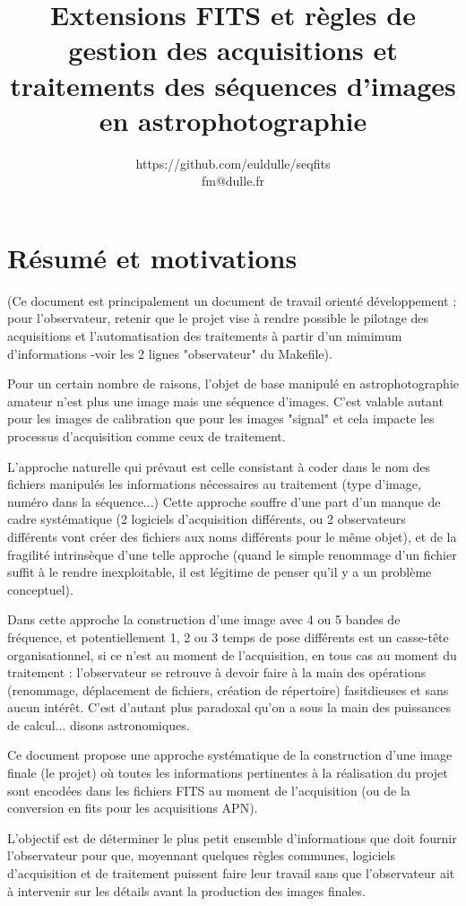 \documentclass[10pt,a4paper,french]{article}
\title{Extensions FITS et règles de gestion des acquisitions et traitements des séquences d'images en astrophotographie}
\author{https://github.com/euldulle/seqfits\\fm@dulle.fr}
\begin{document}
\maketitle
\parindent=0cm
\parskip=0.3cm
\section*{Résumé et motivations}

(Ce document est principalement un document de travail orienté développement ;
pour l'observateur, retenir que le projet vise à rendre possible le pilotage des 
acquisitions et l'automatisation des traitements à partir d'un mimimum d'informations 
-voir les 2 lignes "observateur" du Makefile).

Pour un certain nombre de raisons, l'objet de base manipulé en astrophotographie amateur 
n'est plus une image mais une séquence d'images. C'est valable autant pour les images de
calibration que pour les images "signal" et cela impacte les processus d'acquisition 
comme ceux de traitement.

L'approche naturelle qui prévaut est celle consistant à coder dans le nom des fichiers
manipulés les informations nécessaires au traitement (type d'image, numéro dans la séquence...)
Cette approche souffre d'une part d'un manque de cadre systématique (2 logiciels d'acquisition
différents, ou 2 observateurs différents vont créer des fichiers aux noms différents pour
le même objet), et de la fragilité intrinsèque d'une telle approche (quand le simple renommage 
d'un fichier suffit à le rendre inexploitable, il est légitime de penser qu'il y a un 
problème conceptuel).

Dans cette approche la construction d'une image avec 4 ou 5 bandes de fréquence, et potentiellement
1, 2 ou 3 temps de pose différents est un casse-tête organisationnel, si ce n'est au moment 
de l'acquisition, en tous cas au moment du traitement : l'observateur se retrouve à devoir 
faire à la main des opérations (renommage, déplacement de fichiers, création de répertoire)
fasitdieuses et sans aucun intérêt. C'est d'autant plus paradoxal qu'on a sous la main 
des puissances de calcul... disons astronomiques.

Ce document propose une approche systématique de la construction d'une image finale (le projet) 
où toutes les informations pertinentes à la réalisation du projet sont encodées dans les 
fichiers FITS au moment de l'acquisition (ou de la conversion en fits pour les acquisitions APN).

L'objectif est de déterminer le plus petit ensemble d'informations que doit fournir
l'observateur pour que, moyennant quelques règles communes, logiciels d'acquisition et de traitement
puissent faire leur travail sans que l'observateur ait à intervenir sur les détails 
avant la production des images finales.
\end{document}
